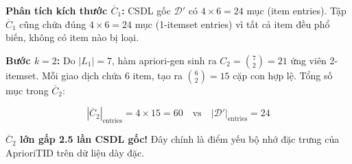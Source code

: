 \documentclass[12pt]{article}
\begin{document}
\textbf{Phân tích kích thước $\overline{C}_1$:} CSDL gốc $\mathcal{D}'$ có $4 \times 6 = 24$ mục (item entries). Tập $\overline{C}_1$ cũng chứa đúng $4 \times 6 = 24$ mục (1-itemset entries) vì tất cả item đều phổ biến, không có item nào bị loại.

\textbf{Bước $k=2$:} Do $|L_1| = 7$, hàm apriori-gen sinh ra $C_2 = \binom{7}{2} = 21$ ứng viên 2-itemset. Mỗi giao dịch chứa 6 item, tạo ra $\binom{6}{2} = 15$ cặp con hợp lệ. Tổng số mục trong $\overline{C}_2$:

$$|\overline{C}_2|_{\text{entries}} = 4 \times 15 = 60 \quad \text{vs} \quad |\mathcal{D}'|_{\text{entries}} = 24$$

\textbf{$\overline{C}_2$ lớn gấp 2.5 lần CSDL gốc!} Đây chính là điểm yếu bộ nhớ đặc trưng của AprioriTID trên dữ liệu dày đặc.
\end{document}
